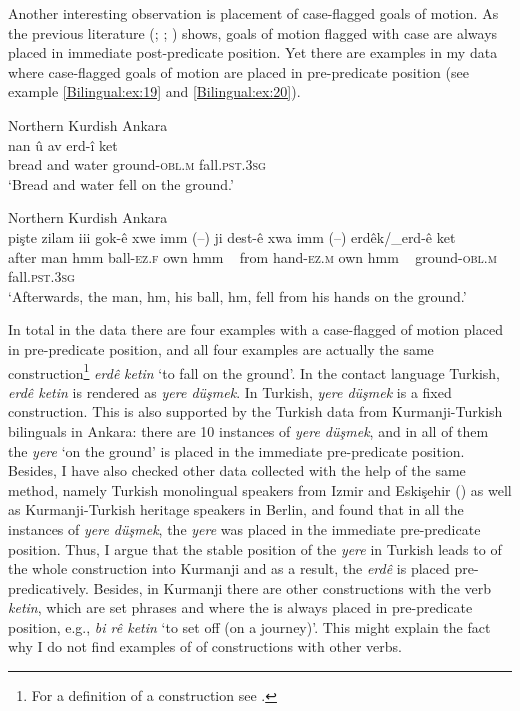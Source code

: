 \documentclass[output=paper,colorlinks,citecolor=brown]{langscibook}
\begin{document}
Another interesting observation is placement of case-flagged goals of motion. As the previous literature (\citealt{haig_verb-goal_2015}; \citealt{haig2018northern}; \citealt{gundogdu2019asymmetries}) shows, goals of motion flagged with case are always placed in immediate post-predicate position. Yet there are examples in my data where case-flagged goals of motion are placed in pre-predicate position (see example \ref{Bilingual:ex:19} and \ref{Bilingual:ex:20}).

\ea\label{Bilingual:ex:19} 
Northern Kurdish Ankara \citep[N, 373]{iefremenko2021KurdishAnkara} \\
\gll nan û av erd-î ket \\
bread and water ground\textsc{-obl.m} fall\textsc{.pst.3sg} \\
\glt `Bread and water fell on the ground.' 
\z

\ea\label{Bilingual:ex:20} 
Northern Kurdish Ankara \citep[O, 386]{iefremenko2021KurdishAnkara} \\
\gll pişte zilam iii gok-ê xwe imm (--) ji dest-ê xwa imm (--) erdêk/\_erd-ê ket \\
after man hmm ball\textsc{-ez.f} own hmm ~ from hand\textsc{-ez.m} own hmm ~ ground\textsc{-obl.m} fall\textsc{.pst.3sg} \\
\glt `Afterwards, the man, hm, his ball, hm, fell from his hands on the ground.' 
\z

In total in the data there are four examples with a case-flagged  of motion placed in pre-predicate position, and all four examples are actually the same construction\footnote{ For a definition of a construction see \citet[257--262]{croft2004cognitive}.} \textit{erdê} \textit{ketin} `to fall on the ground'. In the contact language Turkish, \textit{erdê ketin} is rendered as \textit{yere düşmek}. In Turkish, \textit{yere düşmek} is a fixed construction. This is also supported by the Turkish data from Kurmanji-Turkish bilinguals in Ankara: there are 10 instances of \textit{yere düşmek}, and in all of them the  \textit{yere} `on the ground' is placed in the immediate pre-predicate position. Besides, I have also checked other data collected with the help of the same method, namely Turkish monolingual speakers from Izmir and Eskişehir (\citealt{wieseetal2021rueg}) as well as Kurmanji-Turkish heritage speakers in Berlin, and found that in all the instances of \textit{yere düşmek}, the  \textit{yere} was placed in the immediate pre-predicate position. Thus, I argue that the stable position of the  \textit{yere} in Turkish leads to  of the whole construction into Kurmanji and as a result, the  \textit{erdê} is placed pre-predicatively. Besides, in Kurmanji there are other constructions with the verb \textit{ketin}, which are set phrases and where the  is always placed in pre-predicate position, e.g., \textit{bi rê ketin} `to set off (on a journey)'. This might explain the fact why I do not find examples of  of constructions with other verbs. 
\end{document}
